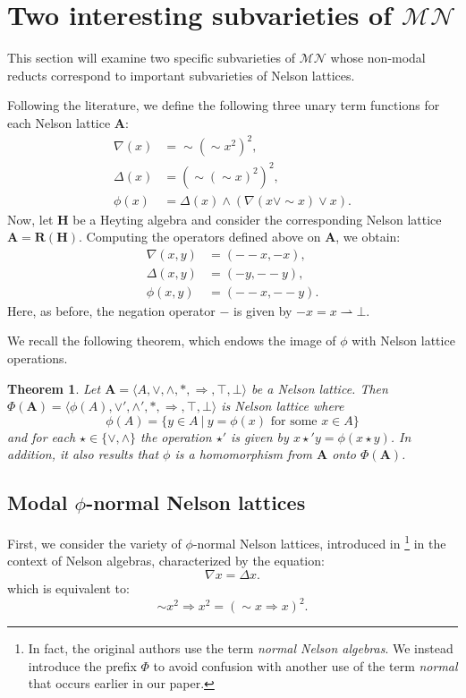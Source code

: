 \documentclass[pdflatex,sn-mathphys-num]{sn-jnl}%
\newcommand{\A}{\mathbf{A}}
\newcommand{\RH}[1]{\mathbf{R}(#1)}
\newcommand{\He}{\mathbf{H}}
\newcommand{\To}{\Rightarrow}
\theoremstyle{thmstyleone}%
\newtheorem{theorem}{Theorem}%
\theoremstyle{thmstyletwo}%
\theoremstyle{thmstylethree}%
\begin{document}
\section{Two interesting subvarieties of \texorpdfstring{$\mathcal{MN}$}{MN}}\label{sec5}

This section will examine two specific subvarieties of $\mathcal{MN}$ whose non-modal reducts correspond to important subvarieties of Nelson lattices.

Following the literature, we define the following three unary term functions for each Nelson lattice $\A$:
\begin{align*}
    \nabla(x) &= \sim(\sim x^2)^2, \\
    \Delta(x) &= (\sim(\sim x)^2)^2, \\
    \phi(x) &= \Delta(x) \wedge (\nabla(x \vee \sim x) \vee x).
\end{align*}
Now, let $\He$ be a Heyting algebra and consider the corresponding Nelson lattice $\A = \RH{\He}$. Computing the operators defined above on $\A$, we obtain:
\begin{align}
    \nabla(x,y) &= (- - x, - x),\\
    \Delta(x,y) &= (- y, - - y), \\
    \phi(x,y) &= (- - x, - - y). \label{fipares}
\end{align}
Here, as before, the negation operator $-$ is given by $- x = x \rightharpoonup \bot$.

We recall the following theorem, which endows the image of $\phi$ with Nelson lattice operations.

\begin{theorem} \cite[Theorem 5.4]{Busaniche} \label{PhiHomo}
Let $\A = \langle A,\vee,\wedge,*,\To,\top,\bot\rangle$ be a Nelson lattice. Then $\Phi(\A)= \langle \phi(A),\vee',\wedge',*,\To,\top,\bot\rangle$ is Nelson lattice where
$$\phi(A)= \{y \in A \  | \ y = \phi(x) \mbox{ for some } x \in A \} $$
and for each $\star \in \{\vee,\wedge \}$ the operation $\star'$ is given by $x \star' y = \phi(x \star y)$. In addition, it also results that $\phi$ is a homomorphism from $\A$ onto $\Phi(\A)$.
\end{theorem}

\subsection{Modal \texorpdfstring{$\phi$}{phi}-normal Nelson lattices}

First, we consider the variety of $\phi$-normal Nelson lattices, introduced in \cite{Gor85}\footnote{In fact, the original authors use the term \emph{normal Nelson algebras}. We instead introduce the prefix $\Phi$ to avoid confusion with another use of the term \emph{normal} that occurs earlier in our paper.} in the context of Nelson algebras, characterized by the equation:
\begin{equation}\label{NormalN3}
    \nabla x  = \Delta x.
\end{equation}
which is equivalent to:
\begin{equation*}
    \sim x^2 \To x^2 = (\sim x \To x)^2.
\end{equation*}
\end{document}
